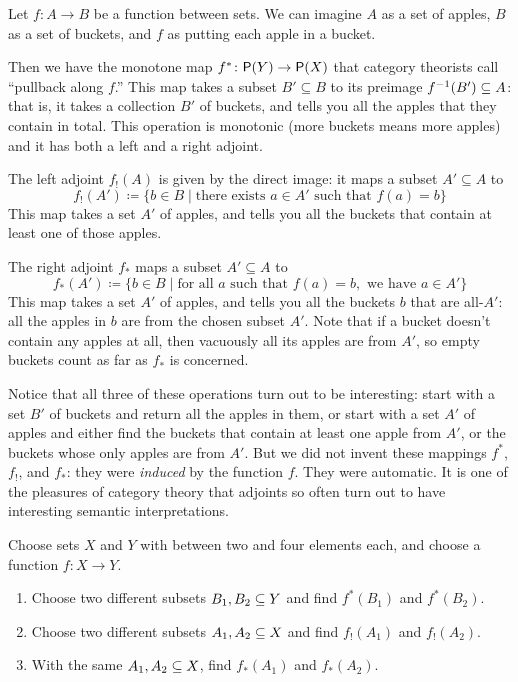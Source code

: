 \documentclass[7Sketches]{subfiles}
\begin{document}
\begin{example}%
  Let $f\colon A \to B$ be a function between sets. We can imagine $A$ as a set
  of apples, $B$ as a set of buckets, and $f$ as putting each apple in a bucket.
  
  Then we have the monotone map $f^\ast\colon \powset(Y) \to \powset(X)$ that category theorists call
  ``pullback along $f$.'' This map takes a subset $B' \subseteq B$ to its preimage
  $f\inv (B') \subseteq A$: that is, it takes a collection $B'$ of buckets, and tells
  you all the apples that they contain in total. This operation is monotonic (more buckets means more apples) and it has both a left and a right adjoint. %
  
  The left adjoint $f_!(A)$ is given by the direct image: it maps a subset $A' \subseteq A$ to
  \[
  f_!(A') \coloneqq \{b \in B\mid \mbox{there exists }a \in A' \mbox{ such that }
  f(a) = b\}
  \]
  This map takes a set $A'$ of apples, and tells you all the buckets that
  contain at least one of those apples.

  The right adjoint $f_*$ maps a subset $A' \subseteq A$ to 
  \[
  f_*(A')\coloneqq\{b \in B\mid \mbox{for all }a \mbox{ such that } f(a)=b,\mbox{ we have } a \in A'\}
  \]
  This map takes a set $A'$ of apples, and tells you all the buckets $b$ that are all-$A'$: all the apples in $b$ are from the chosen subset $A'$. Note that if a bucket doesn't contain any apples at
  all, then vacuously all its apples are from $A'$, so empty buckets count as far as $f_*$ is concerned.
 
  Notice that all three of these operations turn out to be interesting: start with a set $B'$ of buckets and return all the apples in them, or start with a set $A'$ of apples and either find the buckets that contain at least one apple from $A'$, or the buckets whose only apples are from $A'$. But we did not invent these mappings $f^*$, $f_!$, and $f_*$: they were \emph{induced} by the function $f$. They were automatic. It is one of the pleasures of category theory that adjoints so often turn out to have interesting semantic interpretations.
\end{example}

\begin{exercise}%
\label{exc.subsets_!*}
Choose sets $X$ and $Y$ with between two and four elements each, and choose a function $f\colon X\to Y$.
\begin{enumerate}
	\item Choose two different subsets $B_1,B_2\ss Y$ and find $f^*(B_1)$ and $f^*(B_2)$.
	\item Choose two different subsets $A_1,A_2\ss X$ and find $f_!(A_1)$ and $f_!(A_2)$.
	\item With the same $A_1,A_2\ss X$, find $f_*(A_1)$ and $f_*(A_2)$.\qedhere
\qedhere
\end{enumerate}
\end{exercise}
\end{document}
